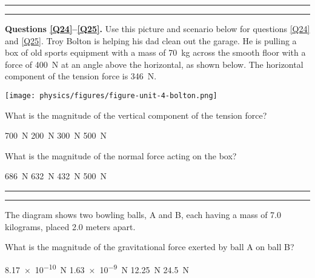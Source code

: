 \documentclass[answers]{exam}
\begin{document}
\begin{questions}
\bigskip
\hrule\hrule


\begin{EnvUplevel}
    \textbf{Questions \ref{Q24}--\ref{Q25}.} Use this picture and scenario below for questions \ref{Q24} and \ref{Q25}. Troy Bolton is helping his dad clean out the garage. He is pulling a box of old sports equipment with a mass of \SI{70}{kg} across the smooth floor with a force of \SI{400}{N} at an angle above the horizontal, as shown below. The horizontal component of the tension force is \SI{346}{N}.
\end{EnvUplevel}

\begin{center}
    \texttt{[image: physics/figures/figure-unit-4-bolton.png]}
\end{center}

\question \label{Q24}
What is the magnitude of the vertical component of the tension force?

\begin{randomizeoneparchoices}[norandomize]
    \choice \SI{700}{N}
    \correctchoice \SI{200}{N}
    \choice \SI{300}{N}
    \choice \SI{500}{N}
\end{randomizeoneparchoices}

\question \label{Q25}
What is the magnitude of the normal force acting on the box?

\begin{randomizeoneparchoices}[norandomize]
    \choice \SI{686}{N}
    \choice \SI{632}{N}
    \choice \SI{432}{N}
    \correctchoice \SI{500}{N}
\end{randomizeoneparchoices}
\bigskip
\hrule\hrule

\question
The diagram shows two bowling balls, A and B, each having a mass of 7.0 kilograms, placed 2.0 meters apart.

\begin{center}
\end{center}

What is the magnitude of the gravitational force exerted by ball A on ball B?

\begin{randomizeoneparchoices}
    \correctchoice \SI{8.17e-10}{N}
    \choice \SI{1.63e-9}{N}
    \choice \SI{12.25}{N}
    \choice \SI{24.5}{N}
\end{randomizeoneparchoices}


\end{questions}
\end{document}
